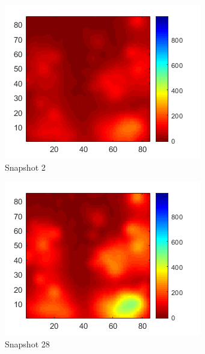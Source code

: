 \documentclass[letterpaper,12pt,peerreviewca,draftcls]{IEEEtran}
\begin{document}
\begin{figure}[h]
\begin{subfigure}[t]{0.23\textwidth}
		\includegraphics[width=\linewidth]{"Figure 15e"}
		\caption{Snapshot 2}
	\end{subfigure}
	\begin{subfigure}[t]{0.23\textwidth}
		\includegraphics[width=\linewidth]{"Figure 15f"}
		\caption{Snapshot 28}
	\end{subfigure}
	\begin{subfigure}[t]{0.23\textwidth}

\end{subfigure}
\end{figure}
\end{document}
